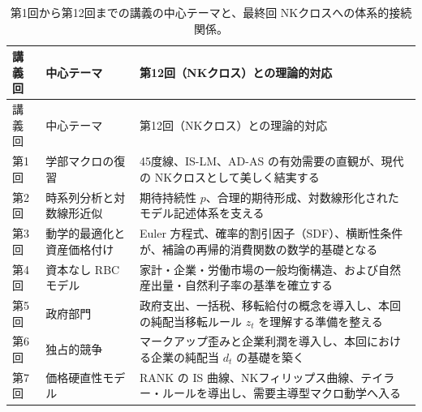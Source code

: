 \documentclass[
  japanese,
  lualatex,
  ja=standard,
  12pt,
  a4paper]{ltjsarticle}
\begin{document}
\begin{longtable}[]{@{}
  >{\raggedleft\arraybackslash}p{}
  >{\raggedright\arraybackslash}p{}
  >{\raggedright\arraybackslash}p{}@{}}
\caption{第1回から第12回までの講義の中心テーマと、最終回
NKクロスへの体系的接続関係。}\label{tbl-course-map}\tabularnewline
\toprule\noalign{}
\begin{minipage}[b]{\linewidth}\raggedleft
講義回
\end{minipage} & \begin{minipage}[b]{\linewidth}\raggedright
中心テーマ
\end{minipage} & \begin{minipage}[b]{\linewidth}\raggedright
第12回（NKクロス）との理論的対応
\end{minipage} \\
\midrule\noalign{}
\endfirsthead
\toprule\noalign{}
\begin{minipage}[b]{\linewidth}\raggedleft
講義回
\end{minipage} & \begin{minipage}[b]{\linewidth}\raggedright
中心テーマ
\end{minipage} & \begin{minipage}[b]{\linewidth}\raggedright
第12回（NKクロス）との理論的対応
\end{minipage} \\
\midrule\noalign{}
\endhead
\bottomrule\noalign{}
\endlastfoot
第1回 & 学部マクロの復習 & 45度線、IS-LM、AD-AS
の有効需要の直観が、現代の NKクロスとして美しく結実する \\
第2回 & 時系列分析と対数線形近似 & 期待持続性
\(p\)、合理的期待形成、対数線形化されたモデル記述体系を支える \\
第3回 & 動学的最適化と資産価格付け & Euler
方程式、確率的割引因子（SDF）、横断性条件が、補論の再帰的消費関数の数学的基礎となる \\
第4回 & 資本なし RBC モデル &
家計・企業・労働市場の一般均衡構造、および自然産出量・自然利子率の基準を確立する \\
第5回 & 政府部門 &
政府支出、一括税、移転給付の概念を導入し、本回の純配当移転ルール \(z_t\)
を理解する準備を整える \\
第6回 & 独占的競争 &
マークアップ歪みと企業利潤を導入し、本回における企業の純配当 \(d_t\)
の基礎を築く \\
第7回 & 価格硬直性モデル & RANK の IS
曲線、NKフィリップス曲線、テイラー・ルールを導出し、需要主導型マクロ動学へ入る \\

\end{longtable}
\end{document}
